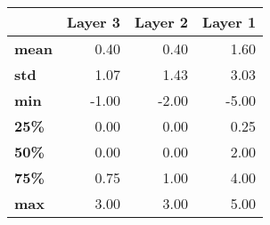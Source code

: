 \begin{tabular}{lrrr}
\toprule
{} &  Layer 3 &  Layer 2 &  Layer 1 \\
\midrule
\textbf{mean} &     0.40 &     0.40 &     1.60 \\
\textbf{std } &     1.07 &     1.43 &     3.03 \\
\textbf{min } &    -1.00 &    -2.00 &    -5.00 \\
\textbf{25\% } &     0.00 &     0.00 &     0.25 \\
\textbf{50\% } &     0.00 &     0.00 &     2.00 \\
\textbf{75\% } &     0.75 &     1.00 &     4.00 \\
\textbf{max } &     3.00 &     3.00 &     5.00 \\
\bottomrule
\end{tabular}
